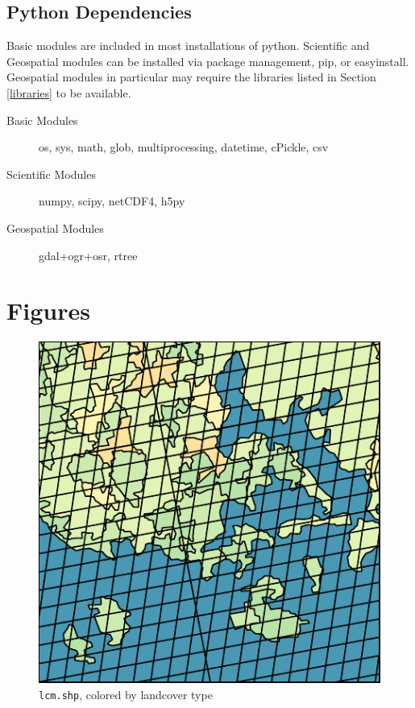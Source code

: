 \documentclass[twoside,a4paper]{refart}
\begin{document}
\subsection{Python Dependencies}\label{python-modules}
Basic modules are included in most installations of python.  Scientific and Geospatial modules can be installed via package management, pip, or easyinstall. Geospatial modules in particular may require the libraries listed in Section \ref{libraries} to be available.
\begin{description}
\item[Basic Modules]
        os, sys, math, glob, multiprocessing, datetime, cPickle, csv

\item[Scientific Modules]
        numpy, scipy, netCDF4, h5py

\item[Geospatial Modules]
        gdal+ogr+osr, rtree
     
\end{description}


\section{Figures}
\label{figs}

\begin{figure}
\includegraphics{thumbs/lcm_landcover}
\caption{\texttt{lcm.shp}, colored by landcover type}
\end{figure}
\end{document}
